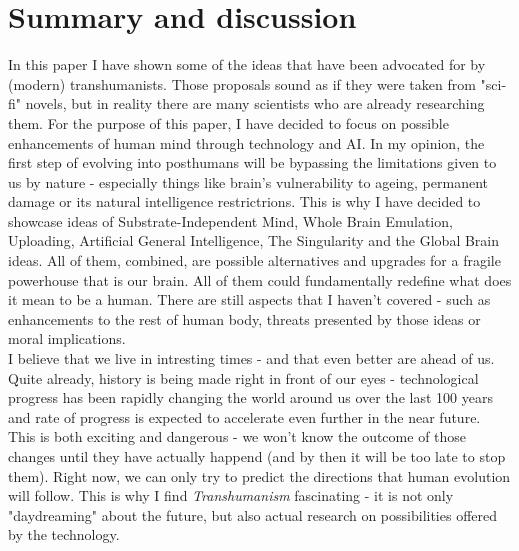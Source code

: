 \documentclass[12pt]{article}
\begin{document}
\section{Summary and discussion} 
	In this paper I have shown some of the ideas that have been advocated for by (modern) transhumanists. Those proposals sound as if they were taken from "sci-fi" novels, but in reality there are many scientists who are already researching them. For the purpose of this paper, I have decided to focus on possible enhancements of human mind through technology and AI. In my opinion, the first step of evolving into posthumans will be bypassing the limitations given to us by nature - especially things like brain's vulnerability to ageing, permanent damage or its natural intelligence restrictrions. This is why I have decided to showcase ideas of Substrate-Independent Mind, Whole Brain Emulation, Uploading, Artificial General Intelligence, The Singularity and the Global Brain ideas. All of them, combined, are possible alternatives and upgrades for a fragile powerhouse that is our brain. All of them could fundamentally redefine what does it mean to be a human. There are still aspects that I haven't covered - such as enhancements to the rest of human body, threats presented by those ideas or moral implications. 
	\\I believe that we live in intresting times - and that even better are ahead of us. Quite already, history is being made right in front of our eyes - technological progress has been rapidly changing the world around us over the last 100 years and rate of progress is expected to accelerate even further in the near future. This is both exciting and dangerous - we won't know the outcome of those changes until they have actually happend (and by then it will be too late to stop them). Right now, we can only try to predict the directions that human evolution will follow. This is why I find \emph{Transhumanism} fascinating - it is not only "daydreaming" about the future, but also actual research on possibilities offered by the technology.

\raggedright


\end{document}
